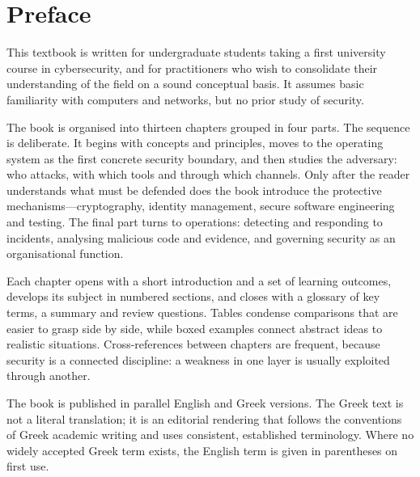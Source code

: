 \chapter*{Preface}

This textbook is written for undergraduate students taking a first university course in cybersecurity, and for practitioners who wish to consolidate their understanding of the field on a sound conceptual basis. It assumes basic familiarity with computers and networks, but no prior study of security.

The book is organised into thirteen chapters grouped in four parts. The sequence is deliberate. It begins with concepts and principles, moves to the operating system as the first concrete security boundary, and then studies the adversary: who attacks, with which tools and through which channels. Only after the reader understands what must be defended does the book introduce the protective mechanisms—cryptography, identity management, secure software engineering and testing. The final part turns to operations: detecting and responding to incidents, analysing malicious code and evidence, and governing security as an organisational function.

Each chapter opens with a short introduction and a set of learning outcomes, develops its subject in numbered sections, and closes with a glossary of key terms, a summary and review questions. Tables condense comparisons that are easier to grasp side by side, while boxed examples connect abstract ideas to realistic situations. Cross-references between chapters are frequent, because security is a connected discipline: a weakness in one layer is usually exploited through another.

The book is published in parallel English and Greek versions. The Greek text is not a literal translation; it is an editorial rendering that follows the conventions of Greek academic writing and uses consistent, established terminology. Where no widely accepted Greek term exists, the English term is given in parentheses on first use.
